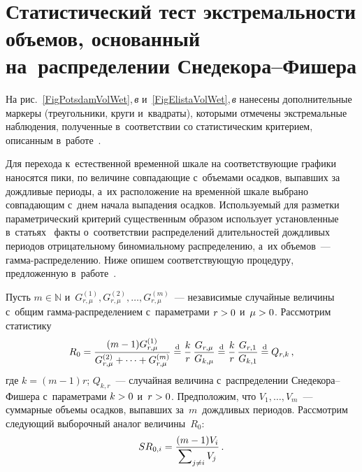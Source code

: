 \begin{multicols}{2}



\begin{figure*}[b] %
\vspace*{4pt}
 \begin{center}
 \mbox{%
 \epsfxsize=106.504mm 
 }
 \end{center}
\vspace*{-9pt}

\label{FigMethods}
\end{figure*}


\section{Статистический тест экстремальности объемов, основанный 
на~распределении Снедекора--Фишера}
\label{StatExtremes}

На рис.~\ref{FigPotsdamVolWet},\,\textit{в} и~\ref{FigElistaVolWet},\,\textit{в} 
нанесены дополнительные маркеры (треугольники, круги и~квадраты), 
которыми отмечены экстремальные наблюдения, полученные в~соответствии 
со статистическим критерием, описанным в~работе~\cite{Gorshenin2018as}. 

Для перехода к~естественной временной шкале на со\-от\-вет\-ст\-ву\-ющие графики 
наносятся пики, по величине совпадающие с~объемами осадков, выпавших за 
дождливые периоды, а~их расположение на временн$\acute{\mbox{о}}$й шкале выбрано совпадающим с~днем 
начала выпадения осадков. Используемый для разметки параметрический критерий 
существенным образом использует установленные 
в~статьях~\cite{Gorshenin2017a,Gorshenin2017b,Gorshenin2017c,Gorshenin2017d,Gorshenin2018bs,Gorshenin2018c} 
факты о~соответствии распределений длительностей дождливых периодов отрицательному 
биномиальному распределению, а~их объемов~--- гам\-ма-рас\-пре\-де\-ле\-нию. 
%
Ниже опишем соответствующую процедуру, предложенную в~работе~\cite{Gorshenin2018as}.

Пусть $m\in\mathbb{N}$ и~$G^{(1)}_{r,\mu},G^{(2)}_{r,\mu},\ldots,G^{(m)}_{r,\mu}$~--- 
независимые случайные величины с~общим гам\-ма-рас\-пре\-де\-ле\-ни\-ем 
с~параметрами $r\hm>0$ и~$\mu\hm>0$. Рассмотрим статистику
\begin{equation*}
R_0=\displaystyle\frac{\displaystyle (m-1)G^{(1)}_{r,\mu}\mathstrut}{\displaystyle G^{(2)}_{r,\mu}+
\cdots+G^{(m)}_{r,\mu}\mathstrut}\stackrel{\mathrm{d}}{=}
\displaystyle\frac{\displaystyle k\mathstrut}{\displaystyle r\mathstrut}\,\displaystyle\frac{\displaystyle G_{r,\mu}\mathstrut}{\displaystyle G_{k,\mu}\mathstrut}\stackrel{\mathrm{d}}{=}\displaystyle\frac{\displaystyle k\mathstrut}{\displaystyle r\mathstrut}\,\displaystyle\frac{\displaystyle G_{r,1}\mathstrut}{\displaystyle G_{k,1}\mathstrut}\stackrel{\mathrm{d}}{=}
Q_{r,k}\,,
\end{equation*}
где $k=(m-1)r$; $Q_{k,r}$~---  случайная величина с~распределении 
Сне\-де\-ко\-ра--Фи\-ше\-ра с~параметрами $k\hm>0$ и~$r\hm>0$. Предположим, что 
$V_1,\ldots,V_m$~--- суммарные объемы осадков, выпавших за~$m$~дождли\-вых периодов. 
Рассмотрим следующий выборочный аналог величины~$R_0$:
\begin{equation*}
SR_{0,i}=\displaystyle\frac{\displaystyle (m-1)V_i\mathstrut}{\displaystyle \sum\nolimits_{j\neq i}V_j\mathstrut}\,.
\end{equation*}




\end{multicols}
